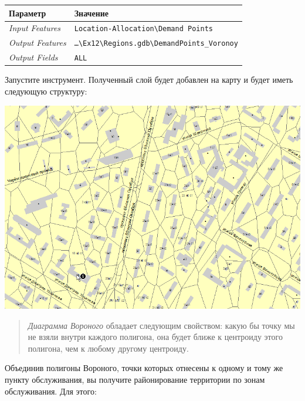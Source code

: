 \documentclass[12pt,]{book}
\begin{document}
\begin{enumerate}
  \begin{longtable}[]{@{}ll@{}}
  \toprule
  Параметр & Значение\tabularnewline
  \midrule
  \endhead
  \emph{Input Features} & \texttt{Location-Allocation\textbackslash{}Demand\ Points}\tabularnewline
  \emph{Output Features} & \texttt{\ldots{}\textbackslash{}Ex12\textbackslash{}Regions.gdb\textbackslash{}DemandPoints\_Voronoy}\tabularnewline
  \emph{Output Fields} & \texttt{ALL}\tabularnewline
  \bottomrule
  \end{longtable}

  Запустите инструмент. Полученный слой будет добавлен на карту и будет иметь следующую структуру:

  \includegraphics{images/Ex12/image30.png}
\end{enumerate}

\begin{quote}
\emph{Диаграмма Вороного} обладает следующим свойством: какую бы точку мы не взяли внутри каждого полигона, она будет ближе к центроиду этого полигона, чем к любому другому центроиду.
\end{quote}

Объединив полигоны Вороного, точки которых отнесены к одному и тому же пункту обслуживания, вы получите районирование территории по зонам обслуживания. Для этого:
\end{document}
